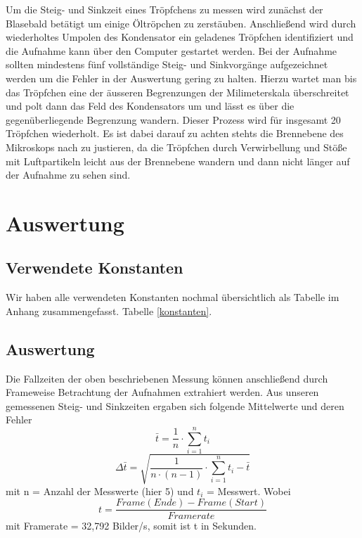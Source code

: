 \documentclass{scrartcl}
\begin{document}
		Um die Steig- und Sinkzeit eines Tröpfchens zu messen wird zunächst der Blasebald betätigt um einige
		Öltröpchen zu zerstäuben. Anschließend wird durch wiederholtes Umpolen des Kondensator ein geladenes Tröpfchen 
		identifiziert und die Aufnahme kann über den Computer gestartet werden. Bei der Aufnahme sollten mindestens fünf
		vollständige Steig- und Sinkvorgänge aufgezeichnet werden um die Fehler in der Auswertung gering zu halten.
		Hierzu wartet man bis das Tröpfchen eine der äusseren Begrenzungen der Milimeterskala überschreitet und polt dann
		das Feld des Kondensators um und lässt es über die gegenüberliegende Begrenzung wandern.
		Dieser Prozess wird für insgesamt 20 Tröpfchen wiederholt. Es ist dabei darauf zu achten stehts
		die Brennebene des Mikroskops nach zu justieren, da die Tröpfchen durch Verwirbellung und Stöße mit 
		Luftpartikeln leicht aus der Brennebene wandern und dann nicht länger auf der Aufnahme zu sehen sind.

        \section{Auswertung}
            \subsection*{Verwendete Konstanten}
                Wir haben alle verwendeten Konstanten nochmal übersichtlich als Tabelle im Anhang zusammengefasst.
                Tabelle \ref{konstanten}.
            \subsection*{Auswertung}
            Die Fallzeiten der oben beschriebenen Messung können anschließend durch Frameweise Betrachtung der Aufnahmen
            extrahiert werden.
            Aus unseren gemessenen Steig- und Sinkzeiten ergaben sich folgende Mittelwerte und deren Fehler
            \begin{equation}
                \bar{t} = \frac{1}{n} \cdot \sum_{i=1}^n t_i
            \end{equation}
            \begin{equation}
                \Delta \bar{t} = \sqrt{\frac{1}{n\cdot(n-1)}\cdot \sum_{i=1}^n{t_i - \bar{t}}}
            \end{equation}
            mit n = Anzahl der Messwerte (hier 5) und $t_i$ = Messwert.
            Wobei 
            \begin{equation}
                t = \frac{Frame(Ende)-Frame(Start)}{Framerate}
            \end{equation}
            mit Framerate = 32,792 Bilder/s, somit ist t in Sekunden.
\end{document}
